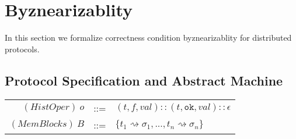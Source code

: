 \documentclass[UTF8, 8pt, a4paper ]{ctexart}
\begin{document}
\begin{small}
\begin{center}
		
	\end{center}
	
	
	
	
	\kspace
	
	\begin{comment}
	\subsubsection{Multiple-Steps of Global Transition}
	
	
	$ (W,S) \longmworldstep{\ H\ } (W',S') \ \triangleq\ \exists k.\ (W,S) \longkworldstep{\ H \ }{k} (W', S') $
	
	\begin{center}	
		$
		\inferrule[Wzero-Step]
		{\ }
		{(W,S) \longkworldstep{\ \epsilon \ }{0} (W, S)}
		$
		\qquad 
		$
		\inferrule[W-Steps]
		{(W,S) \longworldstep{\ e \ } (W'',S'') \\
			(W'', S'') \longkworldstep{\ H' \ }{k} (W',S') }
		{(W,S) \longkworldstep{\ e::H' \ }{k\!\!+\!\!1} (W', S')}
		$
		
	
		
	\end{center}
\end{comment}	
	\pagebreak

	
	\section{Byznearizablity}
		
	In this section we formalize correctness condition byznearizablity for distributed protocols.
	
	
	
	\subsection{Protocol Specification and Abstract Machine}
	
	\begin{longtable}{rcl}
		\hline
		
		$ (\!\textit{HistOper})\ o $ & ::= & $ (t, f, val)::(t, \texttt{ok}, val)::\epsilon $ \\
		
		$ (\!\textit{MemBlocks}) \ B $ & ::= & $ \{t_1 \rightsquigarrow \sigma_1, ..., t_n \rightsquigarrow \sigma_n \} $ \\
		

\end{longtable}
\end{small}
\end{document}
